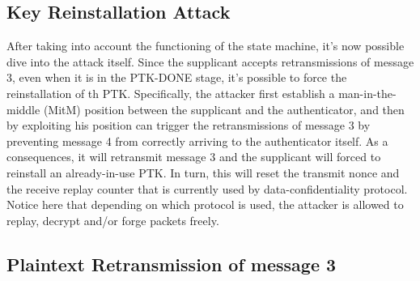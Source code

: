 \subsection{Key Reinstallation Attack}

After taking into account the functioning of the state machine, it's now possible dive into the attack itself. Since the supplicant accepts retransmissions of message 3, even
when it is in the PTK-DONE stage, it's possible to force the reinstallation of th PTK. Specifically, the attacker first establish a man-in-the-middle (MitM) position between the 
supplicant and the authenticator, and then by exploiting his position can trigger the retransmissions of message 3 by preventing message 4 from correctly arriving to the authenticator
itself. As a consequences, it will retransmit message 3 and the supplicant will forced to reinstall an already-in-use PTK. In turn, this will reset the transmit nonce and the receive replay
counter that is currently used by data-confidentiality protocol. Notice here that depending on which protocol is used, the attacker is allowed to replay, decrypt and/or forge packets freely.

\subsection{Plaintext Retransmission of message 3}

